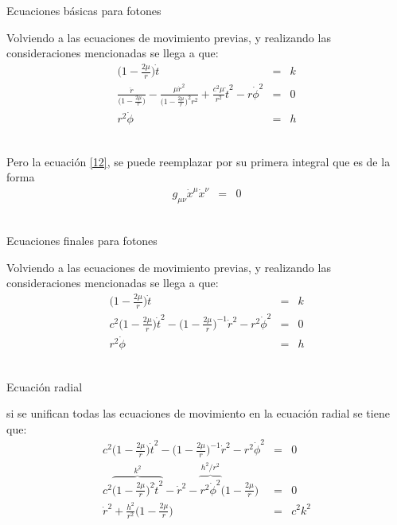 \documentclass[xcolor=dvipsnames]{beamer}
\begin{document}
  \begin{frame}{Ecuaciones básicas para fotones}
    \begin{block}{}
        Volviendo a las ecuaciones de movimiento previas, y realizando las consideraciones mencionadas se llega a que:
          \begin{eqnarray}
      \Big(1-\frac{2\mu}{r} \Big)\dot{t}&=&k \label{02}\\
      \frac{\ddot{r}}{\Big(1-\frac{2\mu}{r} \Big)}-\frac{\mu\dot{r}^{2}}{\Big(1-\frac{2\mu}{r} \Big)^{2} r^{2}}+\frac{c^{2}\mu}{r^{2}}\dot{t}^{2}-r\dot{\phi}^{2}&=&0 \label{12}\\
      r^{2}\dot{\phi}&=&h\label{22}
        \end{eqnarray}\\
\end{block}
    
    \begin{block}{}
        Pero la ecuación \ref{12}, se puede reemplazar por su primera integral que es de la forma
        \begin{eqnarray}
      g_{\mu \nu}\dot{x}^{\mu}\dot{x}^{\nu}&=&0
        \end{eqnarray}\\
    \end{block}
  \end{frame}


  \begin{frame}{Ecuaciones finales para fotones}
    \begin{block}{}
        Volviendo a las ecuaciones de movimiento previas, y realizando las consideraciones mencionadas se llega a que:
          \begin{eqnarray}
      \Big(1-\frac{2\mu}{r} \Big)\dot{t}&=&k \label{02}\\
      c^{2}\Big( 1- \frac{2\mu}{r}\Big) \dot{t}^{2}-\Big( 1- \frac{2\mu}{r}\Big)^{-1} \dot{r}^{2}-r^{2}\dot{\phi}^{2}&=&0\label{1f} \\
       r^{2}\dot{\phi}&=&h\label{2f}
        \end{eqnarray}\\
    \end{block}
  \end{frame}

  \begin{frame}{Ecuación radial}
    \begin{block}{}
    si se unifican todas las ecuaciones de movimiento en la ecuación radial se tiene que:
          \begin{eqnarray*}
      c^{2}\Big( 1- \frac{2\mu}{r}\Big) \dot{t}^{2}-\Big( 1- \frac{2\mu}{r}\Big)^{-1} \dot{r}^{2}-r^{2}\dot{\phi}^{2}&=&0\\
      c^{2}\overbrace{\Big( 1- \frac{2\mu}{r}\Big)^{2} \dot{t}^{2}}^{k^{2}}- \dot{r}^{2}-\overbrace{r^{2}\dot{\phi}^{2}}^{h^2/r^{2}}\Big( 1- \frac{2\mu}{r}\Big)&=&0\\
      \dot{r}^{2}+\frac{h^2}{r^{2}}\Big( 1- \frac{2\mu}{r}\Big)&=& c^{2}k^{2}
        \end{eqnarray*}\\
    \end{block}
  \end{frame}
  
\end{document}

